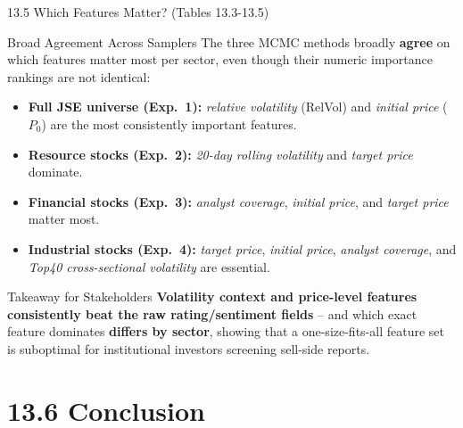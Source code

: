 \documentclass[aspectratio=169,10pt]{beamer}
\begin{document}
\begin{frame}{13.5 \; Which Features Matter? (Tables 13.3-13.5)}
  \begin{block}{Broad Agreement Across Samplers}
    The three MCMC methods broadly \textbf{agree} on which features matter
    most per sector, even though their numeric importance rankings are not
    identical:
  \end{block}
  \begin{itemize}
    \item \textbf{Full JSE universe (Exp.\ 1):} \emph{relative volatility}
          (RelVol) and \emph{initial price} ($P_0$) are the most consistently
          important features.
    \item \textbf{Resource stocks (Exp.\ 2):} \emph{20-day rolling
          volatility} and \emph{target price} dominate.
    \item \textbf{Financial stocks (Exp.\ 3):} \emph{analyst coverage},
          \emph{initial price}, and \emph{target price} matter most.
    \item \textbf{Industrial stocks (Exp.\ 4):} \emph{target price},
          \emph{initial price}, \emph{analyst coverage}, and \emph{Top40
          cross-sectional volatility} are essential.
  \end{itemize}
  \begin{alertblock}{Takeaway for Stakeholders}
    \textbf{Volatility context and price-level features consistently beat
    the raw rating/sentiment fields} -- and which exact feature dominates
    \textbf{differs by sector}, showing that a one-size-fits-all feature set
    is suboptimal for institutional investors screening sell-side reports.
  \end{alertblock}
\end{frame}

\section{13.6 Conclusion}
\end{document}
